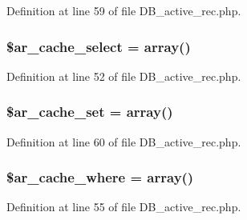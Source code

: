 Definition at line 59 of file D\-B\-\_\-active\-\_\-rec.\-php.

\hypertarget{class_c_i___d_b__active__record_a5109a1bd9153d54fabc8da05ebabf723}{
\subsubsection[{\$ar\-\_\-cache\-\_\-select}]{\setlength{\rightskip}{0pt plus 5cm}\$ar\-\_\-cache\-\_\-select = array()}}\label{class_c_i___d_b__active__record_a5109a1bd9153d54fabc8da05ebabf723}


Definition at line 52 of file D\-B\-\_\-active\-\_\-rec.\-php.

\hypertarget{class_c_i___d_b__active__record_a587ae428156ae056b3f4d88414aa83f4}{
\subsubsection[{\$ar\-\_\-cache\-\_\-set}]{\setlength{\rightskip}{0pt plus 5cm}\$ar\-\_\-cache\-\_\-set = array()}}\label{class_c_i___d_b__active__record_a587ae428156ae056b3f4d88414aa83f4}


Definition at line 60 of file D\-B\-\_\-active\-\_\-rec.\-php.

\hypertarget{class_c_i___d_b__active__record_a2e79a7f06bc14a5ebb45079623e2e64a}{
\subsubsection[{\$ar\-\_\-cache\-\_\-where}]{\setlength{\rightskip}{0pt plus 5cm}\$ar\-\_\-cache\-\_\-where = array()}}\label{class_c_i___d_b__active__record_a2e79a7f06bc14a5ebb45079623e2e64a}


Definition at line 55 of file D\-B\-\_\-active\-\_\-rec.\-php.

